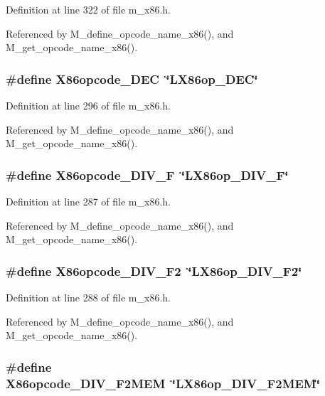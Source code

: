 Definition at line 322 of file m\_\-x86.h.

Referenced by M\_\-define\_\-opcode\_\-name\_\-x86(), and M\_\-get\_\-opcode\_\-name\_\-x86().
\subsubsection{\setlength{\rightskip}{0pt plus 5cm}\#define X86opcode\_\-DEC~\char`\"{}LX86op\_\-DEC\char`\"{}}\label{m__x86_8h_45da23c9a312c4c0a3370f1f3325a4af}




Definition at line 296 of file m\_\-x86.h.

Referenced by M\_\-define\_\-opcode\_\-name\_\-x86(), and M\_\-get\_\-opcode\_\-name\_\-x86().
\subsubsection{\setlength{\rightskip}{0pt plus 5cm}\#define X86opcode\_\-DIV\_\-F~\char`\"{}LX86op\_\-DIV\_\-F\char`\"{}}\label{m__x86_8h_a7dc322dae99712d8715c7ce3b858ef1}




Definition at line 287 of file m\_\-x86.h.

Referenced by M\_\-define\_\-opcode\_\-name\_\-x86(), and M\_\-get\_\-opcode\_\-name\_\-x86().
\subsubsection{\setlength{\rightskip}{0pt plus 5cm}\#define X86opcode\_\-DIV\_\-F2~\char`\"{}LX86op\_\-DIV\_\-F2\char`\"{}}\label{m__x86_8h_9f987c2221c41f125539ce7d75051de8}




Definition at line 288 of file m\_\-x86.h.

Referenced by M\_\-define\_\-opcode\_\-name\_\-x86(), and M\_\-get\_\-opcode\_\-name\_\-x86().
\subsubsection{\setlength{\rightskip}{0pt plus 5cm}\#define X86opcode\_\-DIV\_\-F2MEM~\char`\"{}LX86op\_\-DIV\_\-F2MEM\char`\"{}}\label{m__x86_8h_20cfefc8c1cd04f1e4121a184f3e95e2}





